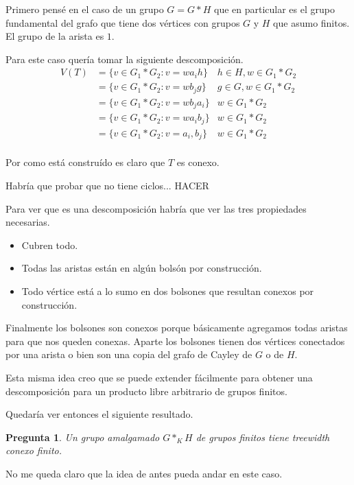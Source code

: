 \documentclass[12pt]{article}
\theoremstyle{plain} %
\newtheorem{preg}[teo]{\color{rojo} Pregunta}
\theoremstyle{definition}
\theoremstyle{remark}
\newcommand{\red}{\textcolor{rojo}}
\begin{document}
Primero pensé en el caso de un grupo $G = G \ast H$ que en particular es el grupo fundamental del grafo que tiene dos vértices con grupos $G$ y $H$ que asumo finitos. El grupo de la arista es $1$.

Para este caso quería tomar la siguiente descomposición.
\begin{align*}
V(T) &= \{ v \in G_1 \ast G_2 : v = wa_ih  \} & h \in H, w \in G_1 \ast G_2 \\
 & = \{ v \in G_1 \ast G_2 : v = wb_jg  \} &  g \in G, w \in G_1 \ast G_2 \\
 & = \{ v \in G_1 \ast G_2 : v = wb_ja_i  \} & w \in G_1 \ast G_2 \\
 & = \{ v \in G_1 \ast G_2 : v = wa_ib_j  \} & w \in G_1 \ast G_2 \\
 & = \{ v \in G_1 \ast G_2 : v = a_i, b_j  \} & w \in G_1 \ast G_2 \\
\end{align*}
	
Por como está construído es claro que $T$ es conexo.

Habría que probar que no tiene ciclos... 
\red{HACER}

Para ver que es una descomposición habría que ver las tres propiedades necesarias.

\begin{itemize}
	\item Cubren todo.
	\item Todas las aristas están en algún bolsón por construcción.
	\item Todo vértice está a lo sumo en dos bolsones que resultan conexos por construcción.
\end{itemize}	
	
Finalmente los bolsones son conexos porque básicamente agregamos todas aristas para que nos queden conexas. 
Aparte los bolsones tienen dos vértices conectados por una arista o bien son una copia del grafo de Cayley de $G$ o de $H$.
	
	
Esta misma idea creo que se puede extender fácilmente para obtener una descomposición para un producto libre arbitrario de grupos finitos.	
	
	
Quedaría ver entonces el siguiente resultado.

\begin{preg}
	Un grupo amalgamado $G \ast_{K} H$	de grupos finitos tiene treewidth conexo finito.
\end{preg}	
	
No me queda claro que la idea de antes pueda andar en este caso. 
\end{document}
